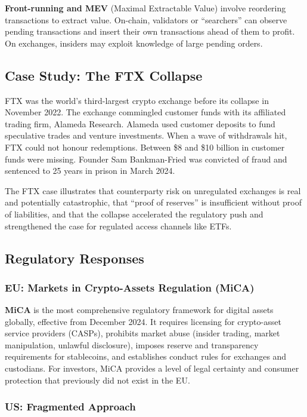 \documentclass[11pt,a4paper]{article}
\newcommand{\keyword}[1]{\textbf{\textcolor{AccentOrange}{#1}}}
\begin{document}
\keyword{Front-running and MEV} (Maximal Extractable Value) involve reordering transactions to extract value. On-chain, validators or ``searchers'' can observe pending transactions and insert their own transactions ahead of them to profit. On exchanges, insiders may exploit knowledge of large pending orders.

\subsection{Case Study: The FTX Collapse}

FTX was the world's third-largest crypto exchange before its collapse in November 2022. The exchange commingled customer funds with its affiliated trading firm, Alameda Research. Alameda used customer deposits to fund speculative trades and venture investments. When a wave of withdrawals hit, FTX could not honour redemptions. Between \$8 and \$10 billion in customer funds were missing. Founder Sam Bankman-Fried was convicted of fraud and sentenced to 25 years in prison in March 2024.

The FTX case illustrates that counterparty risk on unregulated exchanges is real and potentially catastrophic, that ``proof of reserves'' is insufficient without proof of liabilities, and that the collapse accelerated the regulatory push and strengthened the case for regulated access channels like ETFs.

\subsection{Regulatory Responses}

\subsubsection{EU: Markets in Crypto-Assets Regulation (MiCA)}

\keyword{MiCA} is the most comprehensive regulatory framework for digital assets globally, effective from December 2024. It requires licensing for crypto-asset service providers (CASPs), prohibits market abuse (insider trading, market manipulation, unlawful disclosure), imposes reserve and transparency requirements for stablecoins, and establishes conduct rules for exchanges and custodians. For investors, MiCA provides a level of legal certainty and consumer protection that previously did not exist in the EU.

\subsubsection{US: Fragmented Approach}
\end{document}
